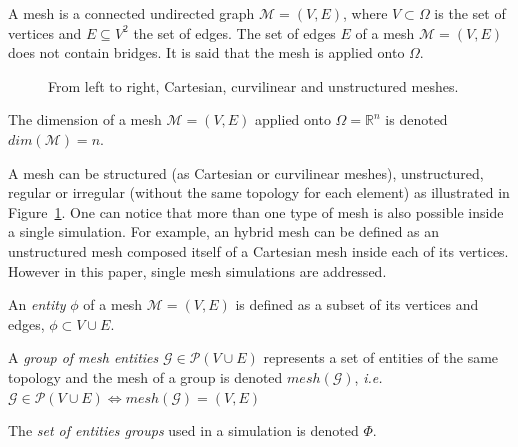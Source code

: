 \begin{mydef}
A mesh is a connected undirected graph $\mathcal{M}=(V,E)$, where $V\subset \Omega$ is the set of vertices and $E\subseteq V^2$ the set of edges. The set of edges $E$ of a mesh $\mathcal{M}=(V,E)$ does not contain bridges. It is said that the mesh is applied onto $\Omega$.
\end{mydef}
\begin{figure}[!h]\begin{center}
  \caption{From left to right, Cartesian, curvilinear and unstructured meshes.}
  \label{fig:mesh1}
\end{center}\end{figure}
\begin{mydef}
The dimension of a mesh $\mathcal{M}=(V,E)$ applied onto $\Omega=\mathbb{R}^n$ is denoted $dim(\mathcal{M})=n$.
\end{mydef}
A mesh can be structured (as Cartesian or curvilinear meshes), unstructured, regular or irregular (without the same topology for each element) as illustrated in Figure~\ref{fig:mesh1}. One can notice that more than one type of mesh is also possible inside a single simulation. For example, an hybrid mesh can be defined as an unstructured mesh composed itself of a Cartesian mesh inside each of its vertices.
However in this paper, single mesh simulations are addressed.

\medskip

\begin{mydefs}
\item An \textit{entity} $\phi$ of a mesh $\mathcal{M}=(V,E)$ is defined as a subset of its vertices and edges, $\phi\subset V\cup E$.
\item A \textit{group of mesh entities} $\mathcal{G} \in \mathcal{P}(V\cup E)$ represents a set of entities of the same topology and the mesh of a group is denoted $mesh(\mathcal{G})$, \textit{i.e.} $\mathcal{G} \in \mathcal{P}(V\cup E) \Leftrightarrow mesh(\mathcal{G})=(V,E)$
\item The \textit{set of entities groups} used in a simulation is denoted $\Phi$.
\end{mydefs}


